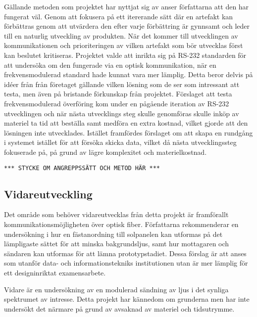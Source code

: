         Gällande metoden som projektet har nyttjat sig av anser författarna att den har fungerat väl. Genom att fokusera på ett itererande sätt där en artefakt kan förbättras genom att utvärdera den efter varje förbättring är gynnsamt och leder till en naturlig utveckling av produkten. När det kommer till utvecklingen av kommunikationen och prioriteringen av vilken artefakt som bör utvecklas först kan beslutet kritiseras. Projektet valde att inrikta sig på RS-232 standarden för att undersöka om den fungerade via en optisk kommunikation, när en frekvensmodulerad standard hade kunnat vara mer lämplig. Detta beror delvis på idéer från från företaget gällande vilken lösning som de ser som intressant att testa, men även på bristande förkunskap från projektet. Förslaget att testa frekvensmodulerad överföring kom under en pågående iteration av RS-232 utvecklingen och när nästa utvecklings steg skulle genomföras skulle inköp av materiel ta tid att beställa samt medföra en extra kostnad, vilket gjorde att den lösningen inte utvecklades. Istället framfördes förslaget om att skapa en rundgång i systemet istället för att försöka skicka data, vilket då nästa utvecklingssteg fokuserade på, på grund av lägre komplexitet och materielkostnad.\bigskip 

        \texttt{*** STYCKE OM ANGREPPSSÄTT OCH METOD HÄR ***}

    \subsection{Vidareutveckling} %
    \label{sub:vidareutveckling}
        Det område som behöver vidareutvecklas från detta projekt är framförallt kommunikationsmöjligheten över optisk fiber. Författarna rekommenderar en undersökning i hur en fästanordning till solpanelen kan utformas på det lämpligaste sättet för att minska bakgrundsljus, samt hur mottagaren och sändaren kan utformas för att lämna prototypstadiet. Dessa förslag är att anses som utanför data- och informationstekniks institutionen utan är mer lämplig för ett designinriktat examensarbete. \bigskip

        Vidare är en undersökning av en modulerad sändning av ljus i det synliga spektrumet av intresse. Detta projekt har kännedom om grunderna men har inte undersökt det närmare på grund av avsaknad av materiel och tidsutrymme.
    
